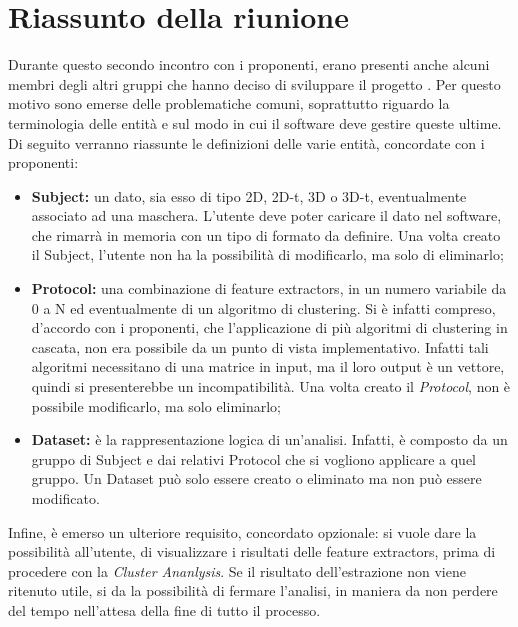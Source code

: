 \section{Riassunto della riunione}
\label{riassunto}
Durante questo secondo incontro con i proponenti, erano presenti anche alcuni membri degli altri gruppi che hanno
deciso di sviluppare il progetto \project. Per questo motivo sono emerse delle problematiche comuni, soprattutto riguardo
la terminologia delle entità e sul modo in cui il software deve gestire queste ultime.
\\Di seguito verranno riassunte le definizioni delle varie entità, concordate con i proponenti:
\begin{itemize}
\item\textbf{Subject:} un dato, sia esso di tipo 2D, 2D-t, 3D o 3D-t, eventualmente associato ad una maschera\glossario{}. L'utente deve poter caricare il dato nel software, che rimarrà in memoria con un tipo di formato da definire. Una volta creato il Subject\glossario{}, l'utente non ha la possibilità di modificarlo, ma solo di eliminarlo;
\item\textbf{Protocol:} una combinazione di feature extractors\glossario{}, in un numero variabile da 0 a N ed eventualmente di un algoritmo di clustering\glossario{}. Si è infatti compreso, d'accordo con i proponenti, che l'applicazione di più algoritmi di clustering\glossario{} in cascata, non era possibile da un punto di vista implementativo. Infatti tali algoritmi necessitano di una matrice in input, ma il loro output è un vettore, quindi si presenterebbe un incompatibilità. Una volta creato il \textit{Protocol}\glossario{}, non è possibile modificarlo, ma solo eliminarlo;
\item\textbf{Dataset:} è la rappresentazione logica di un'analisi. Infatti, è composto da un gruppo di Subject\glossario{} e dai relativi Protocol\glossario{} che si vogliono applicare a quel gruppo. Un Dataset\glossario{} può solo essere creato o eliminato ma non può essere modificato.
\end{itemize}
Infine, è emerso un ulteriore requisito, concordato opzionale: si vuole dare la possibilità all'utente, di visualizzare i risultati delle feature extractors\glossario{}, prima di procedere con la \textit{Cluster Ananlysis}\glossario{}. Se il risultato dell'estrazione non viene ritenuto utile, si da la possibilità di fermare l'analisi, in maniera da non perdere del tempo nell'attesa della fine di tutto il processo.